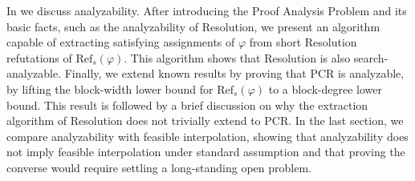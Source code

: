 In  we discuss analyzability. After introducing the Proof Analysis Problem and its basic facts, such as the analyzability of Resolution, we present an algorithm capable of extracting satisfying assignments of $\varphi$ from short Resolution refutations of $\mathrm{Ref}_s(\varphi)$. This algorithm shows that Resolution is also search-analyzable. Finally, we extend known results by proving that PCR is analyzable, by lifting the block-width lower bound for $\mathrm{Ref}_s(\varphi)$ to a block-degree lower bound. This result is followed by a brief discussion on why the extraction algorithm of Resolution does not trivially extend to PCR. In the last section, we compare analyzability with feasible interpolation, showing that analyzability does not imply feasible interpolation under standard assumption  and that proving the converse would require settling a long-standing open problem.

\cleardoublepage
